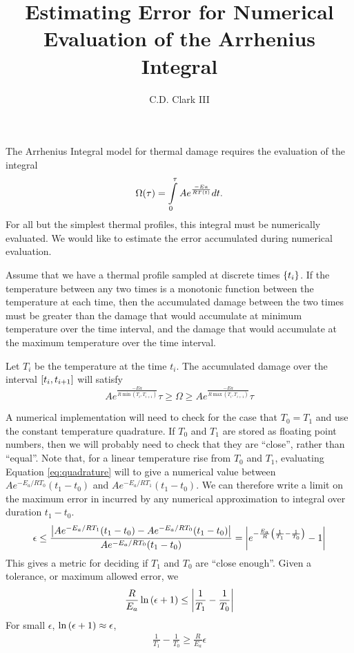 \documentclass{article}
\title{Estimating Error for Numerical Evaluation of the Arrhenius Integral}
\author{C.D. Clark III}
\begin{document}
\maketitle

The Arrhenius
Integral model for thermal damage requires the evaluation of the integral\cite{WELCH--2011--optical-thermalresponseoflaser-irradiatedtissue}
\begin{equation}
  \label{eqn:arr}
  \Omega\qty(\tau) = \int\limits_{0}^{\tau} A e^{\frac{-Ea}{RT\qty(t)}} dt.
\end{equation}
For all but the simplest thermal profiles, this integral must be numerically evaluated. We would like to estimate the error accumulated
during numerical evaluation.

Assume that we have a thermal profile sampled at discrete times $\qty{t_i}$. If the temperature between any two
times is a monotonic function between the temperature at each time, then the accumulated damage between the
two times must be greater than the damage that would accumulate at minimum temperature over the time interval,
and the damage that would accumulate at the maximum temperature over the time interval.

Let $T_i$ be the temperature at the time $t_i$. The accumulated damage over the interval $\qty[t_i,t_{i+1}]$ will
satisfy
\begin{equation}
  A e^{\frac{-Ea}{R\min(T_i,T_{i+1})}} \tau
  \ge
  \Omega
  \ge
  A e^{\frac{-Ea}{R\max(T_i,T_{i+1})}} \tau
\end{equation}

A numerical implementation will need to check for the case that $T_0 = T_1$ and use the constant temperature quadrature. If $T_0$ and $T_1$ are stored as floating point numbers, then
we will probably need to check that they are ``close'', rather than ``equal''. Note that, for a linear temperature rise from $T_0$ and $T_1$, evaluating Equation \ref{eq:quadrature} will
to give a numerical value between $Ae^{-E_a/RT_0}(t_1 - t_0)$ and $Ae^{-E_a/RT_1}(t_1 - t_0)$. We can therefore write a limit on the maximum error in incurred by any numerical approximation to integral over duration $t_1 - t_0$.
\begin{align}
  \epsilon \le \frac{\abs{ Ae^{-E_a/RT_1}(t_1 - t_0) - Ae^{-E_a/RT_0}(t_1 - t_0)} }{Ae^{-E_a/RT_0}(t_1 - t_0)} = \abs{e^{-\frac{E_a}{R} \qty(\frac{1}{T_1} - \frac{1}{T_0})} - 1}
\end{align}
This gives a metric for deciding if $T_1$ and $T_0$ are ``close enough''. Given a tolerance, or maximum allowed error, we 
\begin{align}
  \frac{R}{E_a} \ln \qty( \epsilon + 1 ) \le \abs{ \frac{1}{T_1} - \frac{1}{T_0} }
\end{align}
For small $\epsilon$, $\ln \qty(\epsilon + 1) \approx \epsilon$,
\begin{align}
 \frac{1}{T_1} - \frac{1}{T_0} \ge \frac{R}{E_a}\epsilon
\end{align}







\end{document}
